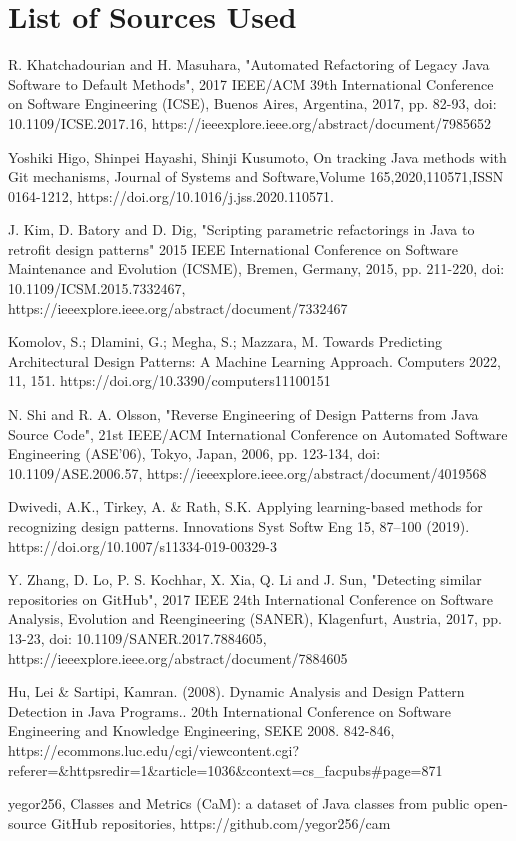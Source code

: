\documentclass[draft]{article}
\begin{document}
\section*{List of Sources Used}
\begin{thebibliography}{9}
  R. Khatchadourian and H. Masuhara, "{}Automated Refactoring of Legacy Java Software to Default Methods"{}, 2017 IEEE/ACM 39th International Conference on Software Engineering (ICSE), Buenos Aires, Argentina, 2017, pp. 82-93, doi: 10.1109/ICSE.2017.16, https://ieeexplore.ieee.org/abstract/document/7985652

  Yoshiki Higo, Shinpei Hayashi, Shinji Kusumoto, On tracking Java methods with Git mechanisms, Journal of Systems and Software,Volume 165,2020,110571,ISSN 0164-1212, https://doi.org/10.1016/j.jss.2020.110571.

  J. Kim, D. Batory and D. Dig, "{}Scripting parametric refactorings in Java to retrofit design patterns"{} 2015 IEEE International Conference on Software Maintenance and Evolution (ICSME), Bremen, Germany, 2015, pp. 211-220, doi: 10.1109/ICSM.2015.7332467, https://ieeexplore.ieee.org/abstract/document/7332467

  Komolov, S.; Dlamini, G.; Megha, S.; Mazzara, M. Towards Predicting Architectural Design Patterns: A Machine Learning Approach. Computers 2022, 11, 151. https://doi.org/10.3390/computers11100151

  N. Shi and R. A. Olsson, "{}Reverse Engineering of Design Patterns from Java Source Code"{}, 21st IEEE/ACM International Conference on Automated Software Engineering (ASE'06), Tokyo, Japan, 2006, pp. 123-134, doi: 10.1109/ASE.2006.57, https://ieeexplore.ieee.org/abstract/document/4019568

  Dwivedi, A.K., Tirkey, A. \& Rath, S.K. Applying learning-based methods for recognizing design patterns. Innovations Syst Softw Eng 15, 87–100 (2019). https://doi.org/10.1007/s11334-019-00329-3

  Y. Zhang, D. Lo, P. S. Kochhar, X. Xia, Q. Li and J. Sun, "{}Detecting similar repositories on GitHub"{}, 2017 IEEE 24th International Conference on Software Analysis, Evolution and Reengineering (SANER), Klagenfurt, Austria, 2017, pp. 13-23, doi: 10.1109/SANER.2017.7884605, https://ieeexplore.ieee.org/abstract/document/7884605

  Hu, Lei \& Sartipi, Kamran. (2008). Dynamic Analysis and Design Pattern Detection in Java Programs.. 20th International Conference on Software Engineering and Knowledge Engineering, SEKE 2008. 842-846, https://ecommons.luc.edu/cgi/viewcontent.cgi?referer=\&httpsredir=1\&article=1036\&context=cs\_facpubs\#page=871

  yegor256, Classes and Metriсs (CaM): a dataset of Java classes from public open-source GitHub repositories, https://github.com/yegor256/cam
\end{thebibliography}
\end{document}
